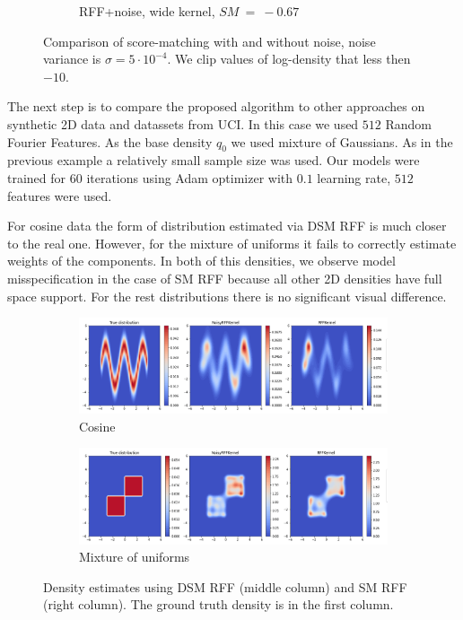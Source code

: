 \begin{figure}[!ht]
\begin{subfigure}[b]{0.32\textwidth}
    \captionsetup{justification=centering}
    \caption{RFF+noise, wide kernel, $SM~=~-0.67$}
    \label{sfig:MoGnoise1}
  \end{subfigure}
  \caption{Comparison of score-matching with and without noise,
    noise variance is
    $\sigma = 5\cdot10^{-4}$.
    We clip values of log-density that less then $-10$.
  }
  \label{fig:demo}
\end{figure}

The next step is to compare the proposed algorithm to other approaches on synthetic 2D data
and datassets from UCI.
In this case we used $512$ Random Fourier Features.
As the base density $q_0$ we used mixture of Gaussians.
As in the previous example a relatively small sample size was used.
Our models were trained for $60$ iterations using Adam optimizer with $0.1$ learning rate,
$512$ features were used.




For cosine data the form of distribution estimated via DSM RFF is much closer
to the real one.
However, for the mixture of uniforms it fails to correctly estimate weights
of the components.
In both of this densities, we observe model misspecification in the case of SM RFF
because all other 2D densities have full space support.
For the rest distributions there is no significant visual difference.
\begin{figure}[!ht]
    \centering
    \begin{subfigure}[b]{\textwidth}
      \includegraphics[width=\textwidth]{figures/score_matching/2D/Cosine1000.png}
      \caption{Cosine}
      \label{sfig:1000Cos}
    \end{subfigure}
    \begin{subfigure}[b]{\textwidth}
      \includegraphics[width=\textwidth]{figures/score_matching/2D/Mixture1000.png}
      \caption{Mixture of uniforms}
      \label{sfig:1000Rings}
    \end{subfigure}
    \caption{Density estimates using DSM RFF (middle column) and SM RFF (right column).
    The ground truth density is in the first column.
    }
    \label{fig:2d_1000}
\end{figure}

